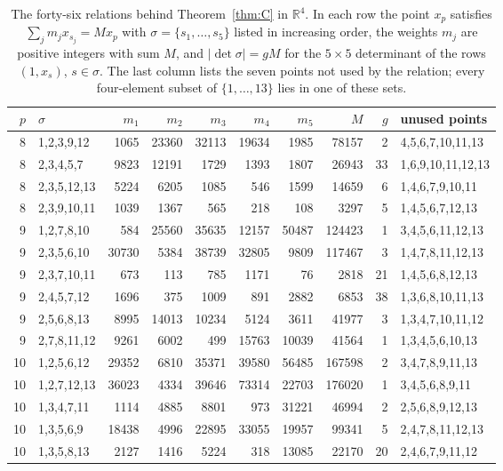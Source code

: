 \begin{table}[tp]
\footnotesize
\caption{The forty-six relations behind Theorem~\ref{thm:C} in $\mathbb{R}^4$. In each row the point $x_p$ satisfies $\sum_j m_j x_{s_j}=M x_p$ with $\sigma=\{s_1,\dots,s_5\}$ listed in increasing order, the weights $m_j$ are positive integers with sum $M$, and $|\det\sigma|=gM$ for the $5\times5$ determinant of the rows $(1,x_s)$, $s\in\sigma$. The last column lists the seven points not used by the relation; every four-element subset of $\{1,\dots,13\}$ lies in one of these sets.}\label{tab:certCfour}
\begin{ruledtabular}
\begin{tabular}{rlrrrrrrrl}
$p$ & $\sigma$ & $m_1$ & $m_2$ & $m_3$ & $m_4$ & $m_5$ & $M$ & $g$ & unused points \\ \hline
8 & 1,2,3,9,12 & 1065 & 23360 & 32113 & 19634 & 1985 & 78157 & 2 & 4,5,6,7,10,11,13 \\
8 & 2,3,4,5,7 & 9823 & 12191 & 1729 & 1393 & 1807 & 26943 & 33 & 1,6,9,10,11,12,13 \\
8 & 2,3,5,12,13 & 5224 & 6205 & 1085 & 546 & 1599 & 14659 & 6 & 1,4,6,7,9,10,11 \\
8 & 2,3,9,10,11 & 1039 & 1367 & 565 & 218 & 108 & 3297 & 5 & 1,4,5,6,7,12,13 \\
9 & 1,2,7,8,10 & 584 & 25560 & 35635 & 12157 & 50487 & 124423 & 1 & 3,4,5,6,11,12,13 \\
9 & 2,3,5,6,10 & 30730 & 5384 & 38739 & 32805 & 9809 & 117467 & 3 & 1,4,7,8,11,12,13 \\
9 & 2,3,7,10,11 & 673 & 113 & 785 & 1171 & 76 & 2818 & 21 & 1,4,5,6,8,12,13 \\
9 & 2,4,5,7,12 & 1696 & 375 & 1009 & 891 & 2882 & 6853 & 38 & 1,3,6,8,10,11,13 \\
9 & 2,5,6,8,13 & 8995 & 14013 & 10234 & 5124 & 3611 & 41977 & 3 & 1,3,4,7,10,11,12 \\
9 & 2,7,8,11,12 & 9261 & 6002 & 499 & 15763 & 10039 & 41564 & 1 & 1,3,4,5,6,10,13 \\
10 & 1,2,5,6,12 & 29352 & 6810 & 35371 & 39580 & 56485 & 167598 & 2 & 3,4,7,8,9,11,13 \\
10 & 1,2,7,12,13 & 36023 & 4334 & 39646 & 73314 & 22703 & 176020 & 1 & 3,4,5,6,8,9,11 \\
10 & 1,3,4,7,11 & 1114 & 4885 & 8801 & 973 & 31221 & 46994 & 2 & 2,5,6,8,9,12,13 \\
10 & 1,3,5,6,9 & 18438 & 4996 & 22895 & 33055 & 19957 & 99341 & 5 & 2,4,7,8,11,12,13 \\
10 & 1,3,5,8,13 & 2127 & 1416 & 5224 & 318 & 13085 & 22170 & 20 & 2,4,6,7,9,11,12 \\

\end{tabular}
\end{ruledtabular}
\end{table}
